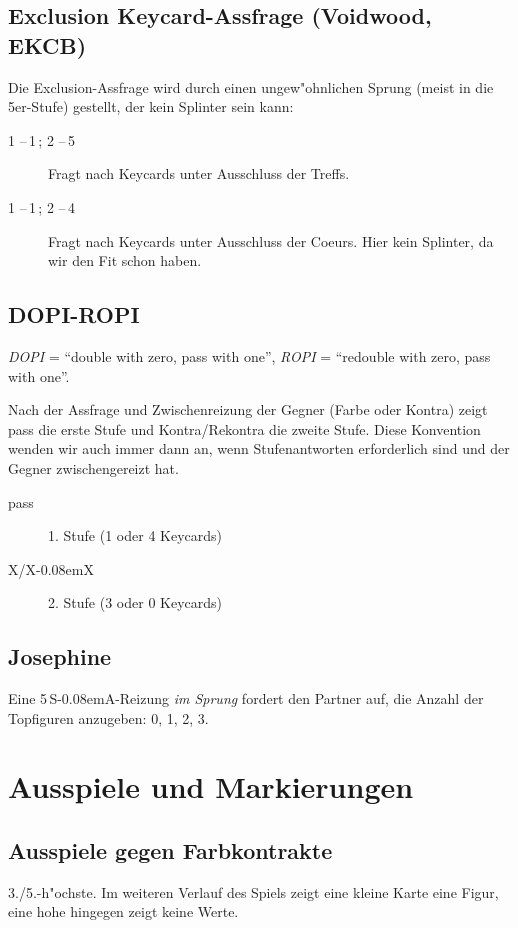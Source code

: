 \documentclass[11pt,german,twocolumn]{scrartcl}
\def\pik{\nobreak\,\Sp}
\def\coe{\nobreak\,\He}
\def\kar{\nobreak\,\Di}
\def\tre{\nobreak\,\Cl}
\def\sa{\nobreak\textsf{S\kern-0.08emA}}
\def\SA{\nobreak\,\sa}
\def\kontra{\textsf{X}}
\def\rekontra{\textsf{X\kern-0.08emX}}
\def\sep{\nobreak\,--\,}
\newcommand{\conv}[1]{\emph{#1}}
\def\bdsc{\begin{description}}
\def\edsc{\end{description}}
\newcommand{\Index}[1]{#1\index{#1}}
\begin{document}
\subsection{Exclusion Keycard-Assfrage (Voidwood, EKCB)}

Die Exclusion-Assfrage wird durch einen ungew"ohnlichen Sprung
(meist in die 5er-Stufe) gestellt, der kein \Index{Splinter} sein kann:
%
\bdsc
\item[1\coe\sep1\pik; 2\coe\sep5\tre] Fragt nach Keycards unter
  Ausschluss der Treffs.
\item[1\tre\sep1\kar; 2\kar\sep4\coe] Fragt nach Keycards unter
  Ausschluss der Coeurs. Hier kein Splinter, da wir den Fit schon
  haben.  \edsc

\subsection{\Index{DOPI-ROPI}}

\conv{DOPI} = ``double with zero, pass with one'', \conv{ROPI} =
``redouble with zero, pass with one''.

Nach der Assfrage und Zwischenreizung der Gegner (Farbe oder Kontra) zeigt pass
die erste Stufe und Kontra/Rekontra die zweite Stufe. Diese Konvention wenden
wir auch immer dann an, wenn Stufenantworten erforderlich sind und der Gegner
zwischengereizt hat.
%
\bdsc
  \item[pass] 1. Stufe (1 oder 4 Keycards)
  \item[\kontra/\rekontra] 2. Stufe (3 oder 0 Keycards)
\edsc

\subsection{Josephine}

Eine 5\SA-Reizung \emph{im Sprung} fordert den Partner auf, die Anzahl der
Topfiguren anzugeben: 0, 1, 2, 3.

\section{Ausspiele und Markierungen}

\subsection{Ausspiele gegen Farbkontrakte}

3./5.-h"ochste. Im weiteren Verlauf des Spiels zeigt eine kleine Karte eine
Figur, eine hohe hingegen zeigt keine Werte.
\end{document}
